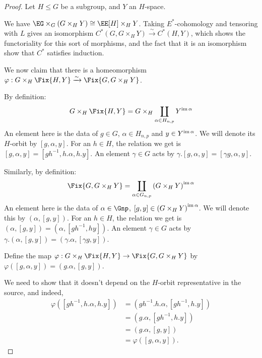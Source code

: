 \begin{proof}
	Let $H \leq G$ be a subgroup, and $Y$ an $H$-space.
	
	We have $\EG \times_G \left(G \times_H Y\right) \cong \EE[H] \times_H Y$.
	Taking $E^*$-cohomology and tensoring with $L$ gives an isomorphism $C^*\left(G, G \times_H Y\right) \xrightarrow{\sim} C^*\left(H, Y\right)$, which shows the functoriality for this sort of morphisms, and the fact that it is an isomorphism show that $C^*$ satisfies induction.
	
	We now claim that there is a homeomorphism $\varphi: G \times_H \Fix{H, Y} \xrightarrow{\sim} \Fix{G, G \times_H Y}$.
	
	By definition:
	$$
	G \times_H \Fix{H, Y}
	= G \times_H \coprod_{\alpha \in H_{n,p}} Y^{\im \alpha}
	$$
	An element here is the data of $g \in G$, $\alpha \in H_{n,p}$ and $y \in Y^{\operatorname{im} \alpha}$.
	We will denote its $H$-orbit by $\left[g, \alpha, y\right]$.
	For an $h \in H$, the relation we get is $\left[g, \alpha, y\right] = \left[gh^{-1}, h.\alpha, h.y\right]$.
	An element $\gamma \in G$ acts by $\gamma. \left[g, \alpha, y\right] = \left[\gamma g, \alpha, y\right]$.
	
	Similarly, by definition:
	$$
	\Fix{G, G \times_H Y}
	= \coprod_{\alpha \in G_{n,p}} \left(G \times_H Y\right)^{\im \alpha}
	$$
	An element here is the data of $\alpha \in \Gnp$, $\left[g, y\right] \in \left(G \times_H Y\right)^{\operatorname{im} \alpha}$.
	We will denote this by $\left(\alpha, \left[g, y\right]\right)$.
	For an $h \in H$, the relation we get is $\left(\alpha, \left[g, y\right]\right) = \left(\alpha, \left[gh^{-1}, hy\right]\right)$.
	An element $\gamma \in G$ acts by $\gamma. \left(\alpha, \left[g, y\right]\right) = \left(\gamma. \alpha, \left[\gamma g, y\right]\right)$.
	
	Define the map $\varphi: G \times_H \Fix{H, Y} \to \Fix{G, G \times_H Y}$ by
	$\varphi\left(\left[g, \alpha, y\right]\right) = \left(g. \alpha, \left[g, y\right]\right)$.
	
	We need to show that it doesn't depend on the $H$-orbit representative in the source, and indeed,
	\begin{align*}
		\varphi\left(\left[gh^{-1}, h.\alpha, h.y\right]\right)
		&= \left(gh^{-1}. h.\alpha, \left[gh^{-1}, h.y\right]\right)\\
		&= \left(g. \alpha, \left[gh^{-1}, h.y\right]\right)\\
		&= \left(g. \alpha, \left[g, y\right]\right)\\
		&=\varphi\left(\left[g, \alpha, y\right]\right).
	\end{align*}
	

\end{proof}
